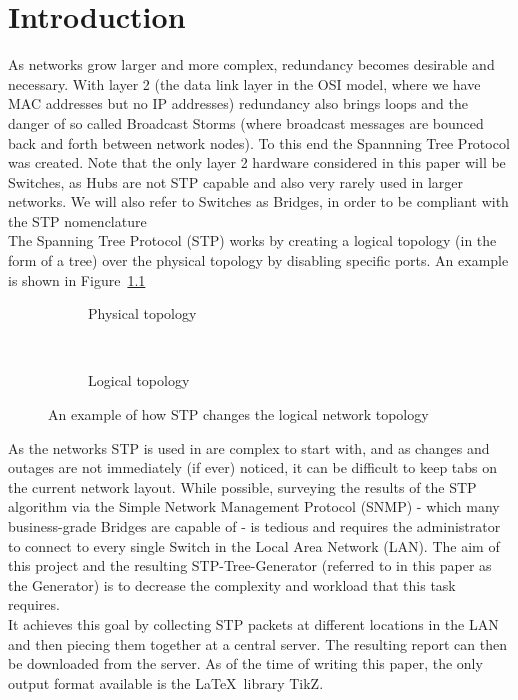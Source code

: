\chapter{Introduction}
As networks grow larger and more complex, redundancy becomes desirable and necessary.
With layer 2 (the data link layer in the OSI model, where we have MAC addresses but no IP addresses) redundancy also brings loops and the danger of so called Broadcast Storms (where broadcast messages are bounced back and forth between network nodes).
To this end the Spannning Tree Protocol\cite{perlman85} was created.
Note that the only layer 2 hardware considered in this paper will be Switches, as Hubs are not STP capable and also very rarely used in larger networks.
We will also refer to Switches as Bridges, in order to be compliant with the STP nomenclature\\
The Spanning Tree Protocol (STP) works by creating a logical topology (in the form of a tree) over the physical topology by disabling specific ports.
An example is shown in Figure~\ref{fig:stp_example}

\begin{figure}[h]
    \begin{center}
    \begin{subfigure}[b]{0.4\textwidth}
    \caption{Physical topology}
    \end{subfigure}
    ~
    \begin{subfigure}[b]{0.4\textwidth}
    \caption{Logical topology}
    \end{subfigure}
    \end{center}
    \caption{An example of how STP changes the logical network topology}
    \label{fig:stp_example}
\end{figure}

As the networks STP is used in are complex to start with, and as changes and outages are not immediately (if ever) noticed, it can be difficult to keep tabs on the current network layout.
While possible, surveying the results of the STP algorithm via the Simple Network Management Protocol (SNMP) - which many business-grade Bridges are capable of - is tedious and requires the administrator to connect to every single Switch in the Local Area Network (LAN).
The aim of this project and the resulting STP-Tree-Generator (referred to in this paper as the Generator) is to decrease the complexity and workload that this task requires.\\

It achieves this goal by collecting STP packets at different locations in the LAN and then piecing them together at a central server.
The resulting report can then be downloaded from the server.
As of the time of writing this paper, the only output format available is the \LaTeX\ library TikZ.
